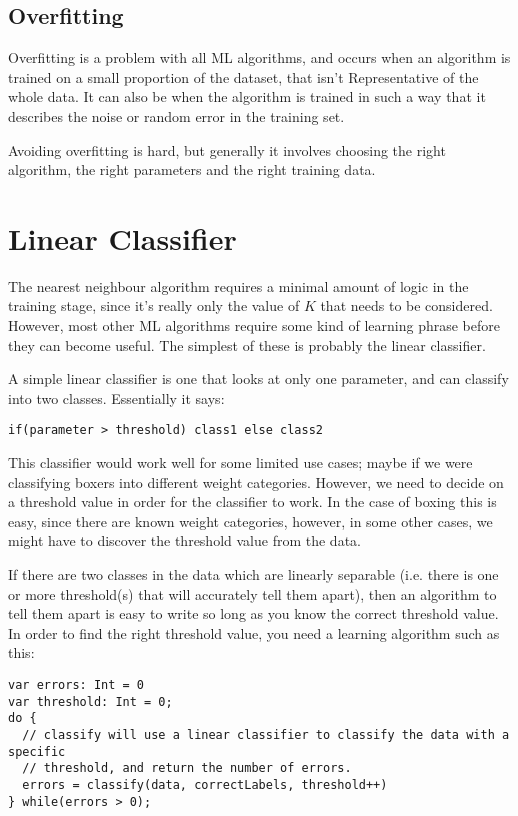 \subsection{Overfitting}

Overfitting is a problem with all ML algorithms, and occurs when an algorithm is
trained on a small proportion of the dataset, that isn't Representative of the
whole data. It can also be when the algorithm is trained in such a way that it
describes the noise or random error in the training set.

Avoiding overfitting is hard, but generally it involves choosing the right
algorithm, the right parameters and the right training data.

\section{Linear Classifier}

The nearest neighbour algorithm requires a minimal amount of logic in the
training stage, since it's really only the value of $K$ that needs to be
considered. However, most other ML algorithms require some kind of learning
phrase before they can become useful. The simplest of these is probably the
linear classifier.

A simple linear classifier is one that looks at only one parameter, and can
classify into two classes. Essentially it says:

\begin{lstlisting}[label=linearClassifier, caption=A simple linear classifier]
if(parameter > threshold) class1 else class2
\end{lstlisting}

This classifier would work well for some limited use cases; maybe if we were
classifying boxers into different weight categories. However, we need to decide
on a threshold value in order for the classifier to work. In the case of boxing
this is easy, since there are known weight categories, however, in some other
cases, we might have to discover the threshold value from the data.

If there are two classes in the data which are linearly separable (i.e. there is
one or more threshold(s) that will accurately tell them apart), then an
algorithm to tell them apart is easy to write so long as you know the correct
threshold value. In order to find the right threshold value, you need a learning
algorithm such as this:

\begin{lstlisting}[label=linearClassifierLearningAlgorithm, caption=Linear classifier learning algorithm]
var errors: Int = 0
var threshold: Int = 0;
do {
  // classify will use a linear classifier to classify the data with a specific
  // threshold, and return the number of errors.
  errors = classify(data, correctLabels, threshold++)
} while(errors > 0);
\end{lstlisting}

